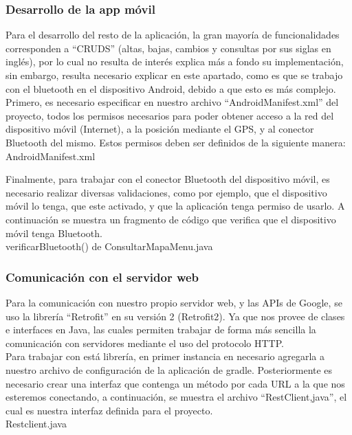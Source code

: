 \subsubsection{Desarrollo de la app móvil}

Para el desarrollo del resto de la aplicación, la gran mayoría de funcionalidades corresponden a ``CRUDS'' (altas, bajas, cambios y consultas por sus siglas en inglés), por lo cual no resulta de interés explica más a fondo su implementación, sin embargo, resulta necesario explicar en este apartado, como es que se trabajo con el bluetooth en el dispositivo Android, debido a que esto es más complejo.\\

Primero, es necesario especificar en nuestro archivo ``AndroidManifest.xml'' del proyecto, todos los permisos necesarios para poder obtener acceso a la red del dispositivo móvil (Internet), a la posición mediante el GPS, y al conector Bluetooth del mismo. Estos permisos deben ser definidos de la siguiente manera:\\AndroidManifest.xml



Finalmente, para trabajar con el conector Bluetooth del dispositivo móvil, es necesario realizar diversas validaciones, como por ejemplo, que el dispositivo móvil lo tenga, que este activado, y que la aplicación tenga permiso de usarlo. A continuación se muestra un fragmento de código que verifica que el dispositivo móvil tenga Bluetooth.\\

verificarBluetooth() de ConsultarMapaMenu.java



\subsubsection{Comunicación con el servidor web}

Para la comunicación con nuestro propio servidor web, y las APIs de Google, se uso la librería ``Retrofit'' en su versión 2 (Retrofit2). Ya que nos provee de clases e interfaces en Java, las cuales permiten trabajar de forma más sencilla la comunicación con servidores mediante el uso del protocolo HTTP.\\ Para trabajar con está librería, en primer instancia en necesario agregarla a nuestro archivo de configuración de la aplicación de gradle. Posteriormente es necesario crear una interfaz que contenga un método por cada URL a la que nos esteremos conectando, a continuación, se muestra el archivo ``RestClient,java'', el cual es nuestra interfaz definida para el proyecto.\\Restclient.java

